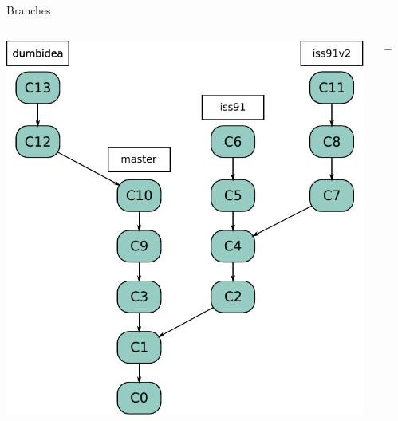 \begin{frame}{Branches}
\begin{columns}[T]
  \begin{column}{.45\textwidth}
    \begin{block}{}
      \includegraphics[scale=0.4]{images/feature-branches1.pdf}
    \end{block}
  \end{column}
  \begin{column}{.1\textwidth}
    \begin{block}{}
      \pause $\longrightarrow$
    \end{block}
  \end{column}
  \begin{column}{.45\textwidth}
    \begin{block}{} 

\end{block}
\end{column}
\end{columns}
\end{frame}
